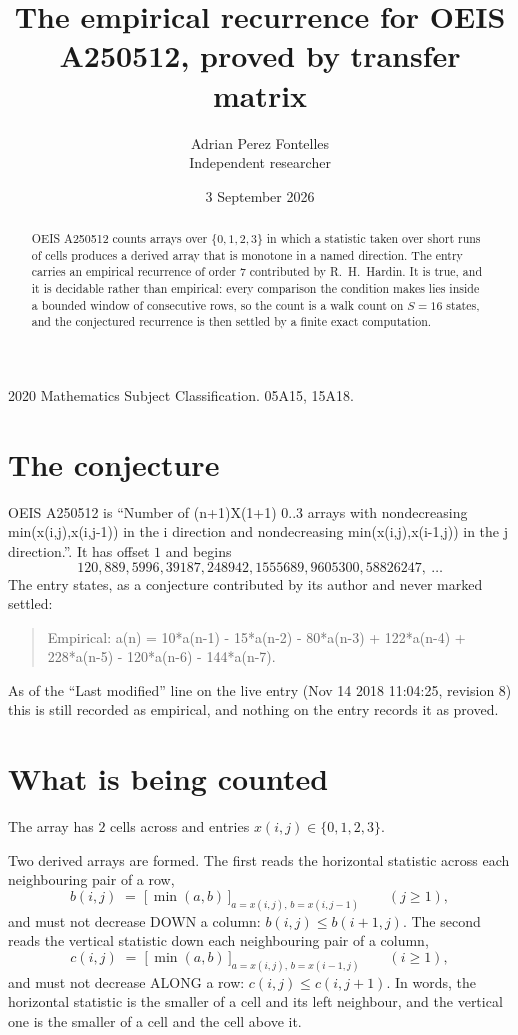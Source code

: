 \documentclass[11pt,a4paper]{article}
\title{The empirical recurrence for OEIS A250512, proved by transfer matrix}
\author{Adrian Perez Fontelles\\ \small Independent researcher}
\date{3 September 2026}
\theoremstyle{plain}
\theoremstyle{definition}
\begin{document}
\maketitle

\begin{abstract}
OEIS A250512 counts arrays over $\{0,1,2,3\}$ in which a statistic taken over short runs
of cells produces a derived array that is monotone in a named direction. The entry carries an
empirical recurrence of order $7$ contributed by R.~H.~Hardin. It is true, and it is
decidable rather than empirical: every comparison the condition makes lies inside a bounded
window of consecutive rows, so the count is a walk count on $S=16$ states, and the
conjectured recurrence is then settled by a finite exact computation.
\end{abstract}

\noindent\small 2020 Mathematics Subject Classification. 05A15, 15A18.\normalsize

\section{The conjecture}

OEIS A250512 is ``Number of (n+1)X(1+1) 0..3 arrays with nondecreasing min(x(i,j),x(i,j-1)) in the i direction and nondecreasing min(x(i,j),x(i-1,j)) in the j direction.''. It has offset $1$ and begins
\[
120, 889, 5996, 39187, 248942, 1555689, 9605300, 58826247,\ \dots
\]
The entry states, as a conjecture contributed by its author and never marked settled:
\begin{quote}
Empirical: a(n) = 10*a(n-1) - 15*a(n-2) - 80*a(n-3) + 122*a(n-4) + 228*a(n-5) - 120*a(n-6) - 144*a(n-7).
\end{quote}
As of the ``Last modified'' line on the live entry (Nov 14 2018 11:04:25, revision 8) this is still
recorded as empirical, and nothing on the entry records it as proved.

\section{What is being counted}

The array has $2$ cells across and entries $x(i,j)\in\{0,1,2,3\}$.

Two derived arrays are formed. The first reads the horizontal statistic across each
neighbouring pair of a row,
\[
b(i,j)\;=\;\bigl[\,\min(a,b)\,\bigr]_{a=x(i,j),\,b=x(i,j-1)}\qquad (j\ge1),
\]
and must not decrease DOWN a column: $b(i,j)\le b(i{+}1,j)$. The second reads the vertical
statistic down each neighbouring pair of a column,
\[
c(i,j)\;=\;\bigl[\,\min(a,b)\,\bigr]_{a=x(i,j),\,b=x(i{-}1,j)}\qquad (i\ge1),
\]
and must not decrease ALONG a row: $c(i,j)\le c(i,j{+}1)$. In words, the horizontal statistic
is the smaller of a cell and its left neighbour, and the vertical one is
the smaller of a cell and the cell above it.
\end{document}
